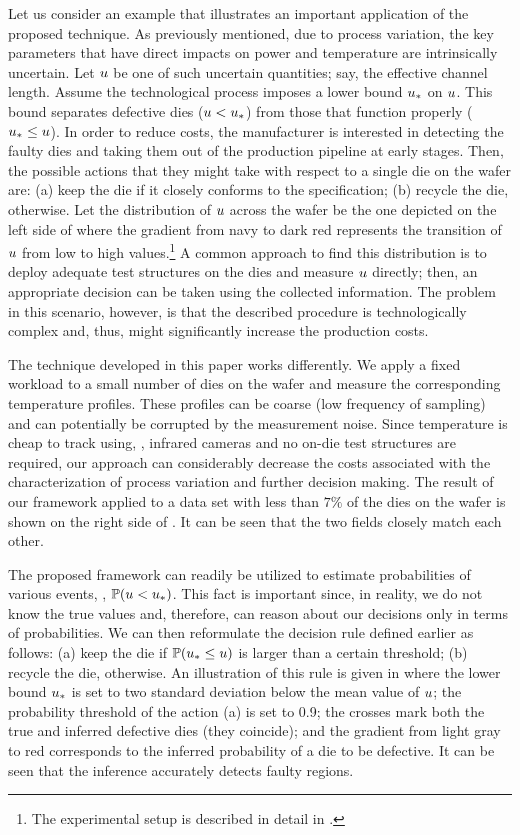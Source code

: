 
Let us consider an example that illustrates an important application of the proposed technique. As previously mentioned, due to process variation, the key parameters that have direct impacts on power and temperature are intrinsically uncertain. Let $u$ be one of such uncertain quantities; say, the effective channel length.
Assume the technological process imposes a lower bound $u_*$ on $u$. This bound separates defective dies ($u < u_*$) from those that function properly ($u_* \leq u$).
In order to reduce costs, the manufacturer is interested in detecting the faulty dies and taking them out of the production pipeline at early stages. Then, the possible actions that they might take with respect to a single die on the wafer are: (a) keep the die if it closely conforms to the specification; (b) recycle the die, otherwise.
Let the distribution of $u$ across the wafer be the one depicted on the left side of  where the gradient from navy to dark red represents the transition of $u$ from low to high values.\footnote{The experimental setup is described in detail in .}
A common approach to find this distribution is to deploy adequate test structures on the dies and measure $u$ directly; then, an appropriate decision can be taken using the collected information. The problem in this scenario, however, is that the described procedure is technologically complex and, thus, might significantly increase the production costs.

The technique developed in this paper works differently. We apply a fixed workload to a small number of dies on the wafer and measure the corresponding temperature profiles. These profiles can be coarse (low frequency of sampling) and can potentially be corrupted by the measurement noise. Since temperature is cheap to track using, \eg, infrared cameras and no on-die test structures are required, our approach can considerably decrease the costs associated with the characterization of process variation and further decision making.
The result of our framework applied to a data set with less than $7\%$ of the dies on the wafer is shown on the right side of . It can be seen that the two fields closely match each other.

The proposed framework can readily be utilized to estimate probabilities of various events, \eg, $\mathbb{P}(u < u_*)$. This fact is important since, in reality, we do not know the true values and, therefore, can reason about our decisions only in terms of probabilities. We can then reformulate the decision rule defined earlier as follows: (a) keep the die if $\mathbb{P}(u_* \leq u)$ is larger than a certain threshold; (b) recycle the die, otherwise.
An illustration of this rule is given in  where the lower bound $u_*$ is set to two standard deviation below the mean value of $u$; the probability threshold of the action (a) is set to 0.9; the crosses mark both the true and inferred defective dies (they coincide); and the gradient from light gray to red corresponds to the inferred probability of a die to be defective. It can be seen that the inference accurately detects faulty regions.


